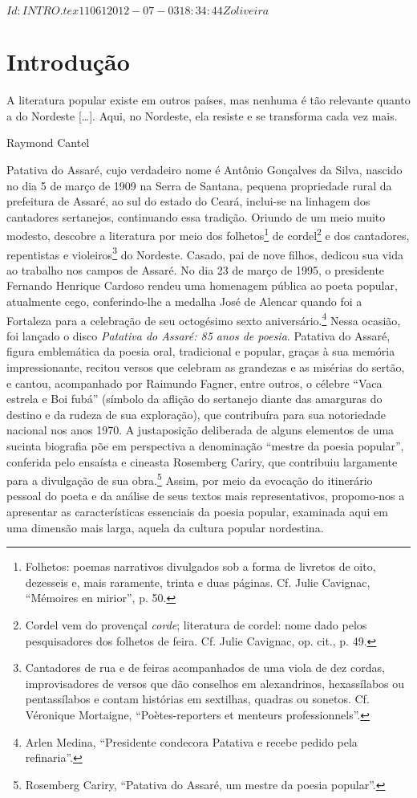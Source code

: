\SVN $Id: INTRO.tex 11061 2012-07-03 18:34:44Z oliveira $

\chapter[Introdução, por Sylvie Debs]{Introdução}


\epigraph{A literatura popular existe em outros países, mas nenhuma é
tão relevante quanto a do Nordeste [\ldots{}]. Aqui, no Nordeste, ela
resiste e se transforma cada vez mais.}{Raymond Cantel\footnotemark}

Patativa do Assaré, cujo verdadeiro nome é Antônio Gonçalves da Silva, nascido
no dia 5 de março de 1909 na Serra de Santana, pequena propriedade rural da
prefeitura de Assaré, ao sul do estado do Ceará, inclui-se na linhagem dos
cantadores sertanejos, continuando essa tradição. Oriundo de um meio muito
modesto, descobre a literatura por meio dos folhetos\footnote{ Folhetos: poemas
narrativos divulgados sob a forma de livretos de oito, dezesseis e, mais
raramente, trinta e duas páginas. Cf. Julie Cavignac, ``Mémoires en
mirior'', p. 50.} de cordel\footnote{
Cordel vem do provençal \textit{corde}; literatura de cordel: nome dado pelos
pesquisadores dos folhetos de feira. Cf. Julie Cavignac, op. cit., p. 49.} e
dos cantadores, repentistas e violeiros\footnote{ Cantadores de rua e de feiras
acompanhados de uma viola de dez cordas, improvisadores de versos que dão
conselhos em alexandrinos, hexassílabos ou pentassílabos e contam histórias em
sextilhas, quadras ou sonetos. Cf. Véronique Mortaigne, “Poètes-reporters et
menteurs professionnels”.} do Nordeste. Casado, pai de nove filhos, dedicou sua
vida ao trabalho nos campos de Assaré. No dia 23 de março de
1995, o presidente Fernando Henrique Cardoso rendeu uma homenagem pública ao
poeta popular, atualmente cego, conferindo-lhe a medalha José de Alencar quando
foi a Fortaleza para a celebração de seu octogésimo sexto aniversário.\footnote{
Arlen Medina, “Presidente condecora Patativa e recebe pedido pela refinaria”.}
Nessa ocasião, foi lançado o disco \textit{Patativa do Assaré: 85 anos de poesia}.
Patativa do Assaré, figura emblemática da poesia oral, tradicional e popular,
graças à sua memória impressionante, recitou versos que celebram as grandezas e
as misérias do sertão, e cantou, acompanhado por Raimundo Fagner, entre outros, o
célebre “Vaca estrela e Boi fubá” (símbolo da aflição do sertanejo diante das
amarguras do destino e da rudeza de sua exploração), que contribuíra para sua
notoriedade nacional nos anos 1970. A justaposição deliberada de alguns
elementos de uma sucinta biografia põe em perspectiva a denominação “mestre da
poesia popular”, conferida pelo ensaísta e cineasta Rosemberg Cariry, que
contribuiu largamente para a divulgação de sua obra.\footnote{ Rosemberg Cariry,
“Patativa do Assaré, um mestre da poesia popular”.} Assim, por meio da evocação
do itinerário pessoal do poeta e da análise de seus textos mais representativos,
propomo-nos a apresentar as características essenciais da poesia popular,
examinada aqui em uma dimensão mais larga, aquela da cultura popular nordestina.

